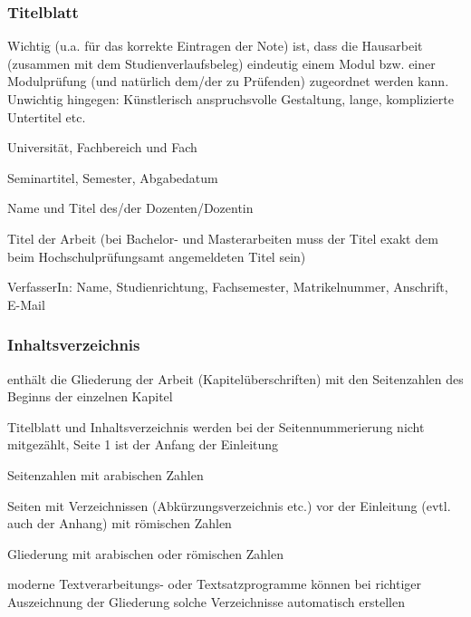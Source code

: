 \documentclass[a4paper,oneside,DIV8,10pt]{scrartcl}
\begin{document}
    \subsubsection{Titelblatt}
    Wichtig (u.a. für das korrekte Eintragen der Note) ist, dass die 
        Hausarbeit (zusammen mit dem Studienverlaufsbeleg) eindeutig 
        einem Modul bzw. einer Modulprüfung (und natürlich dem/der zu Prüfenden) 
        zugeordnet werden kann. Unwichtig hingegen: Künstlerisch anspruchsvolle 
        Gestaltung, lange, komplizierte Untertitel etc.
        \begin{compactitem}
            \item Universität, Fachbereich und Fach
            \item Seminartitel, Semester, Abgabedatum
            \item Name und Titel des/der Dozenten/Dozentin
            \item Titel der Arbeit (bei Bachelor- und Masterarbeiten muss der 
            Titel exakt dem beim Hochschulprüfungsamt angemeldeten Titel sein)
            \item VerfasserIn: Name, Studienrichtung, Fachsemester, Matrikelnummer, Anschrift, E-Mail
        \end{compactitem}

    \subsubsection{Inhaltsverzeichnis}
        \begin{compactitem}
            \item enthält die Gliederung der Arbeit (Kapitelüberschriften) mit 
            den Seitenzahlen des Beginns der einzelnen Kapitel
            \item Titelblatt und Inhaltsverzeichnis werden bei der 
            Seitennummerierung nicht mitgezählt, Seite 1 ist der Anfang der Einleitung
            \item Seitenzahlen mit arabischen Zahlen 
            \item Seiten mit Verzeichnissen (Abkürzungsverzeichnis etc.) vor der Einleitung 
            (evtl. auch der Anhang) mit römischen Zahlen 
            \item Gliederung mit arabischen oder römischen Zahlen
            \item moderne Textverarbeitungs- oder Textsatzprogramme können 
            bei richtiger Auszeichnung der Gliederung solche Verzeichnisse 
            automatisch erstellen
        \end{compactitem}
\end{document}
